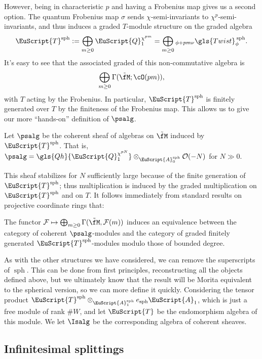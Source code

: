 However, being in characteristic $p$ and having a Frobenius map gives us a second option.  The quantum Frobenius map $\sigma$ sends $\chi$-semi-invariants to $\chi^p$-semi-invariants, and thus induces a graded $T$-module structure on the graded algebra \[\EuScript{T}^{\operatorname{sph}}:=\bigoplus_{m\geq 0}\EuScript{Q}_1^{\chi^{pm}}=\bigoplus_{m\geq 0}{}_{\phi+pm\nu}\gls{Twist}^{\:\operatorname{sph}}_\phi.\]
It's easy to see that the associated graded of this non-commutative algebra is \[\bigoplus_{m\geq 0}\Gamma(\tilde{\fM};\cO(pm)),\] with $T$ acting by the Frobenius. In particular, $\EuScript{T}^{\operatorname{sph}}$ is finitely generated over $T$ by the finiteness of the Frobenius map.
This allows us to give our more ``hands-on'' definition of $\psalg$.
\begin{definition}
 Let $\psalg$ be the coherent sheaf of algebras on $\tilde{\fM}$ induced by $\EuScript{T}^{\operatorname{sph}}$.  That is, $\psalg=\gls{Qh}{\EuScript{Q}_1^{\chi^{pN}}}\otimes_{\EuScript{A}_0^{\operatorname{sph}}}\mathcal{O}(-N)$ for $N\gg 0$.  
\end{definition}
This sheaf stabilizes for $N$ sufficiently large because of the finite generation of $\EuScript{T}^{\operatorname{sph}}$; thus multiplication is induced by the graded multiplication on $\EuScript{T}^{\operatorname{sph}}$ and on $T$.   It follows immediately from standard results on projective coordinate rings that:
\begin{corollary}
  The functor $\mathcal{F}\mapsto \bigoplus_{m\geq 0}\Gamma(\tilde{\fM},\mathcal{F}(m))$ induces an equivalence between the category of coherent $\psalg$-modules and the category of graded finitely generated $\EuScript{T}^{\operatorname{sph}}$-modules modulo those of bounded degree.
\end{corollary}
As with the other structures we have considered, we can remove the superscripts of $\operatorname{sph}$.  This can be done from first principles, reconstructing all the objects defined above, but we ultimately know that the result will be Morita equivalent to the spherical version, so we can more define it quickly.  Considering the tensor product $\EuScript{T}^{\operatorname{sph}}\otimes_{\EuScript{A}_1^{\operatorname{sph}}}e_{\operatorname{sph}}\EuScript{A}_1$, which is just a free module of rank $\#W$, and let $\EuScript{T}$ be the endomorphism algebra of this module.  We let $\Isalg$ be the corresponding algebra of coherent sheaves.  



\subsection{Infinitesimal splittings}

